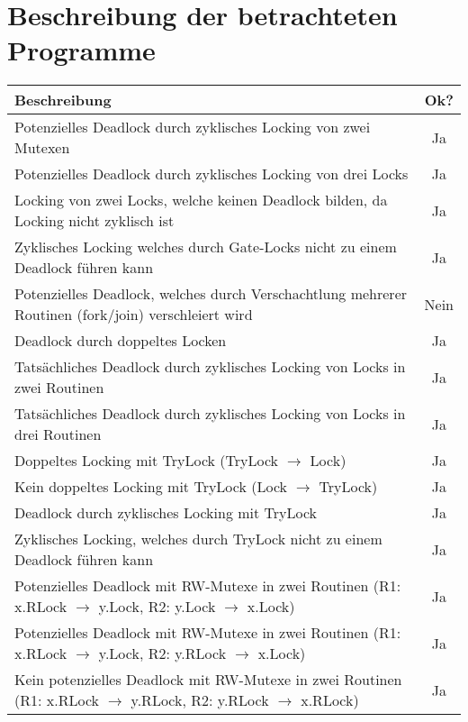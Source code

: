 \appendix
\chapter{Beschreibung der betrachteten Programme}\label{Appendix-1}
\begin{table}[h]
  \centering
  \begin{tabular}{|l|c|}
  \hline
  \textbf{Beschreibung} & \textbf{Ok?} \\ \hline
  Potenzielles Deadlock durch zyklisches Locking von zwei Mutexen & Ja \\ \hline
  Potenzielles Deadlock durch zyklisches Locking von drei Locks & Ja \\ \hline
  Locking von zwei Locks, welche keinen Deadlock bilden, da Locking nicht zyklisch ist & Ja \\ \hline
  Zyklisches Locking welches durch Gate-Locks nicht zu einem Deadlock führen kann & Ja \\ \hline
  \makecell[l]{Potenzielles Deadlock, welches durch Verschachtlung mehrerer\\Routinen (fork/join) verschleiert wird} & Nein \\ \hline
  Deadlock durch doppeltes Locken & Ja \\ \hline
  Tatsächliches Deadlock durch zyklisches Locking von Locks in zwei Routinen & Ja \\ \hline
  Tatsächliches Deadlock durch zyklisches Locking von Locks in drei Routinen & Ja \\ \hline
  Doppeltes Locking mit TryLock (TryLock $\to$ Lock) & Ja \\ \hline
  Kein doppeltes Locking mit TryLock (Lock $\to$ TryLock) & Ja \\ \hline
  Deadlock durch zyklisches Locking mit TryLock & Ja \\ \hline
  Zyklisches Locking, welches durch TryLock nicht zu einem Deadlock führen kann & Ja \\ \hline   
  \makecell[l]{Potenzielles Deadlock mit RW-Mutexe in zwei Routinen\\(R1: x.RLock $\to$ y.Lock, R2: y.Lock $\to$ x.Lock)} & Ja \\ \hline
  \makecell[l]{Potenzielles Deadlock mit RW-Mutexe in zwei Routinen\\(R1: x.RLock $\to$ y.Lock, R2: y.RLock $\to$ x.Lock)} & Ja \\ \hline
  \makecell[l]{Kein potenzielles Deadlock mit RW-Mutexe in zwei Routinen\\(R1: x.RLock $\to$ y.RLock, R2: y.RLock $\to$ x.RLock)} & Ja \\ \hline

\end{tabular}
\end{table}
